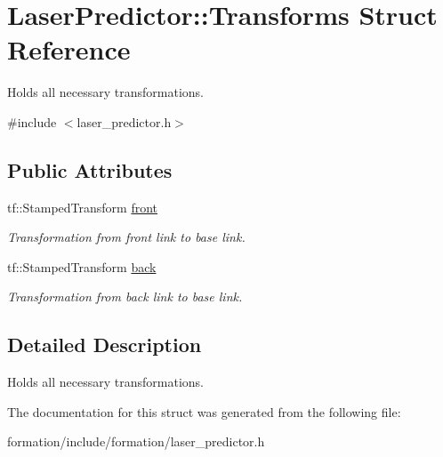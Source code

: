 \hypertarget{structLaserPredictor_1_1Transforms}{}\section{Laser\+Predictor\+:\+:Transforms Struct Reference}
\label{structLaserPredictor_1_1Transforms}


Holds all necessary transformations.  




{\ttfamily \#include $<$laser\+\_\+predictor.\+h$>$}

\subsection*{Public Attributes}
\begin{DoxyCompactItemize}
\item 
tf\+::\+Stamped\+Transform \hyperlink{structLaserPredictor_1_1Transforms_ac9dbf63ff6bdd04249b2430571b667d8}{front}\hypertarget{structLaserPredictor_1_1Transforms_ac9dbf63ff6bdd04249b2430571b667d8}{}\label{structLaserPredictor_1_1Transforms_ac9dbf63ff6bdd04249b2430571b667d8}

\begin{DoxyCompactList}\small\item\em Transformation from front link to base link. \end{DoxyCompactList}\item 
tf\+::\+Stamped\+Transform \hyperlink{structLaserPredictor_1_1Transforms_a06e94a39aa0a24421366af139cf82f8e}{back}\hypertarget{structLaserPredictor_1_1Transforms_a06e94a39aa0a24421366af139cf82f8e}{}\label{structLaserPredictor_1_1Transforms_a06e94a39aa0a24421366af139cf82f8e}

\begin{DoxyCompactList}\small\item\em Transformation from back link to base link. \end{DoxyCompactList}\end{DoxyCompactItemize}


\subsection{Detailed Description}
Holds all necessary transformations. 

The documentation for this struct was generated from the following file\+:\begin{DoxyCompactItemize}
\item 
formation/include/formation/laser\+\_\+predictor.\+h\end{DoxyCompactItemize}
